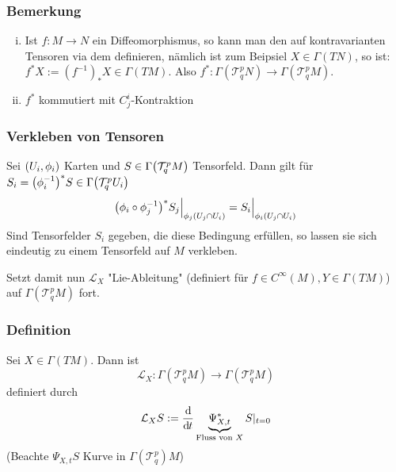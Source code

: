\subsubsection{Bemerkung}
\label{ssub:183}
\begin{enumerate}[(i)]
\item Ist $f:M\to N$ ein Diffeomorphismus, so kann man den  auf kontravarianten Tensoren via dem  definieren, nämlich ist zum Beipsiel $X\in \Gamma(TN)$, so ist: $f^*X:= (f^{-1})_* X \in \Gamma(TM)$. Also $f^*:\Gamma(\mathcal{T}_q^p N)\to \Gamma(\mathcal{T}_q^p M)$.
\item $f^*$ kommutiert mit $C_j^i$-Kontraktion
\end{enumerate}

\subsubsection{Verkleben von Tensoren}
\label{ssub:184}
Sei $(U_i,\phi_i)$ Karten und $S\in \Gamma\enbrace*{\mathcal{T}_q^p M}$ Tensorfeld. Dann gilt für $S_i = \enbrace*{\phi_i^{-1}}^* S\in \Gamma\enbrace*{\mathcal{T}_q^p U_i}$
\[
\enbrace*{\phi_i \circ \phi_j^{-1}}^* S_j \Big\vert_{\phi_j(U_j\cap U_i)} = S_i \Big\vert_{\phi_i(U_j\cap U_i)}
\]
Sind Tensorfelder $S_i$ gegeben, die diese Bedingung erfüllen, so lassen sie sich eindeutig zu einem Tensorfeld auf $M$ verkleben.

Setzt damit nun $\mathcal{L}_X$ "Lie-Ableitung" (definiert für $f\in C^\infty(M), Y\in \Gamma(TM)$) auf $\Gamma(\mathcal{T}_q^p M)$ fort.

\subsubsection{Definition}
\label{ssub:185}
Sei $X\in \Gamma(TM)$. Dann ist
\[
\mathcal{L}_X:\Gamma(\mathcal{T}_q^p M) \to \Gamma(\mathcal{T}_q^p M)
\]
definiert durch
\[
\mathcal{L}_X S:= \frac{\mathrm{d}\mkern-1.0mu}{\mathrm{d}\mkern-1.0mu t} \underbrace{\Psi^*_{X,t}}_{\text{Fluss von } X} S\vert_{t=0}
\]
(Beachte $\Psi_{X,t} S$ Kurve in $\Gamma(\mathcal{T}_q^p) M$)

